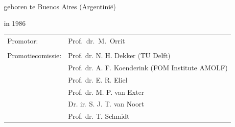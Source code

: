 \begin{titlepage}
\begin{center}
\bigskip
\bigskip

geboren te Buenos Aires (Argentini\"{e})

in 1986

\vspace*{2\bigskipamount}

\end{center}

\clearpage
\thispagestyle{empty}


\medskip\noindent
\begin{tabular}{ll}
    Promotor: & Prof.\ dr.\ M.\ Orrit \\
    & \\
    Promotiecomissie: & Prof. dr. N. H. Dekker (TU Delft)\\
    &	Prof. dr. A. F. Koenderink (FOM Institute AMOLF)\\
    &	Prof. dr. E. R. Eliel \\
    &	Prof. dr. M. P. van Exter \\
    &   Dr. ir. S. J. T. van Noort \\
    &	Prof. dr. T. Schmidt
\end{tabular}


\medskip



\end{titlepage}

